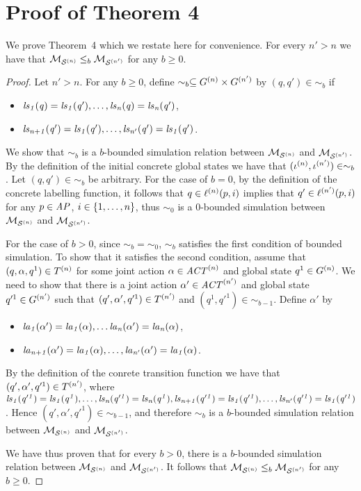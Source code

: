 \documentclass{article}
\newenvironment{customthm}[1]
  {\renewcommand\theinnercustomthm{#1}\innercustomthm}
  {\endinnercustomthm}
\begin{document}
\section*{Proof of Theorem 4}
We prove Theorem~4 which we restate here for convenience.
\begin{customthm}{4}
For every $n' > n$ we have that $\mathcal{M}_{\mathcal{S}^{(n)}} \leq_b \mathcal{M}_{\mathcal{S}^{(n')}}$ for any $b \geq 0$.
\end{customthm}
\begin{proof}
Let $n' > n$. For any $b \geq 0$, define $\sim_b \subseteq G^{(n)}
    \times G^{(n')}$ by $(q,q') \in \sim_b$ if
\begin{itemize}
    \item $\it{ls}_{1}(q) = \it{ls}_{1}(q'), \ldots, \it{ls}_{n}(q) = \it{ls}_{n}(q')$,
    \item $\it{ls}_{n+1}(q')=\it{ls}_{1}(q'), \ldots, \it{ls}_{n'}(q')=\it{ls}_{1}(q')$.
\end{itemize}
We show that $\sim_b$ is a $b$-bounded simulation relation between $\mathcal{M}_{\mathcal{S}^{(n)}}$
    and $\mathcal{M}_{\mathcal{S}^{(n')}}$. By the definition of the initial concrete global states we
    have that $(\iota^{({n})}, \iota^{({n'})}) \in \sim_b$. Let $(q, q') \in
    \sim_b$ be arbitrary. For the case of $b=0$, by the definition of the concrete labelling function, 
    it follows that $q \in \ell^{(n)}(p, i)$ implies that $q' \in \ell^{(n')}(p, i)$ for any $p \in \it{AP}$, $i \in \left \{ 1,\ldots,n \right \}$, thus $\sim_0$ is a $0$-bounded simulation between $\mathcal{M}_{\mathcal{S}^{(n)}}$ and $\mathcal{M}_{\mathcal{S}^{(n')}}$. 

    For the case of $b > 0$, since $\sim_b = \sim_0$, $\sim_b$ satisfies the first condition of bounded simulation. To show that it satisfies the second condition, assume that $(q, \alpha, q^1) \in T^{(n)}$ for some joint action
    $\alpha \in \mathit{ACT}^{(n)}$ and global state $q^1 \in G^{(n)}$. We
    need to show that there is a joint action $\alpha' \in \mathit{ACT}^{(n')}$ and
    global state $q'^1 \in G^{(n')}$ such that $(q', \alpha', q'^1)
    \in T^{(n')}$ and  $(q^1, q'^1) \in \sim_{b-1}$.  Define $\alpha'$ by 
    \begin{itemize}
        \item $\it{la}_{1}({\alpha'}) = \it{la}_{1}({\alpha}), \ldots \it{la}_{n}({\alpha'})=\it{la}_{n}({\alpha})$,
        \item $\it{la}_{n+1}({\alpha'}) = \it{la}_{1}({\alpha}), \ldots, \it{la}_{n'}({\alpha'}) = \it{la}_{1}({\alpha})$.
    \end{itemize}
    By the definition of the conrete transition function we have that $(q',
    \alpha', q'^1) \in T^{(n')}$, where $\it{ls}_{1}(q'^1) = \it{ls}_{1}(q^1),
    \ldots, \it{ls}_{n}(q'^1)=\it{ls}_{n}(q^1),
    \it{ls}_{n+1}(q'^1)=\it{ls}_{1}(q'^1),\ldots,\it{ls}_{n'}(q'^1)=\it{ls}_{1}(q'^1)$. Hence $(q',
    \alpha', q'^1) \in \sim_{b-1}$, and therefore $\sim_b$ is a $b$-bounded simulation relation between $\mathcal{M}_{\mathcal{S}^{(n)}}$ and $\mathcal{M}_{\mathcal{S}^{(n')}}$. 

We have thus proven that for every $b > 0$, there  is a $b$-bounded simulation
    relation between $\mathcal{M}_{\mathcal{S}^{(n)}}$ and $\mathcal{M}_{\mathcal{S}^{(n')}}$. It follows that  $\mathcal{M}_{\mathcal{S}^{(n)}}
    \leq_b \mathcal{M}_{\mathcal{S}^{(n')}}$ for any $b \geq 0$.
\end{proof}
\end{document}
